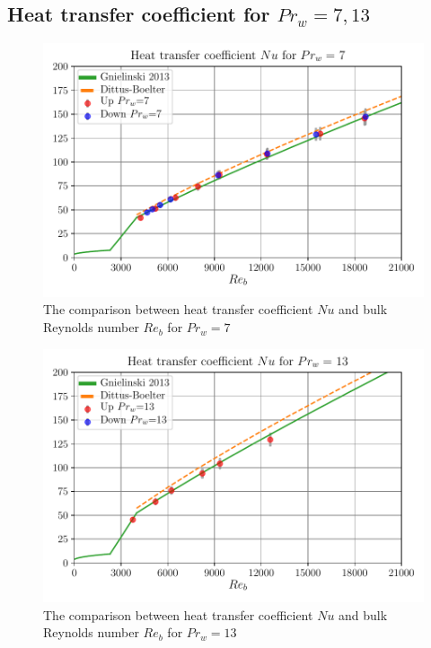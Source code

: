 \documentclass[12pt,oneside]{jbook}
\begin{document}
\clearpage
\subsection{Heat transfer coefficient for $Pr_{w}=7, 13$}

\begin{figure}[ht]
	\vspace{0zh}
	\begin{center}
		\includegraphics[width=0.9\linewidth]{fig/pr7_renu.pdf}
		\vspace{-1zh}
		\caption{The comparison between heat transfer coefficient $Nu$ and bulk Reynolds number $Re_{b}$ for $Pr_{w} = 7$}
		\label{pr7_renu}
	\end{center}
	\vspace{0zh}
\end{figure}

\begin{figure}[ht]
	\vspace{0zh}
	\begin{center}
		\includegraphics[width=0.9\linewidth]{fig/pr13_renu.pdf}
		\vspace{-1zh}
		\caption{The comparison between heat transfer coefficient $Nu$ and bulk Reynolds number $Re_{b}$ for $Pr_{w} = 13$}
		\label{pr13_renu}
	\end{center}
	\vspace{0zh}
\end{figure}
\end{document}
